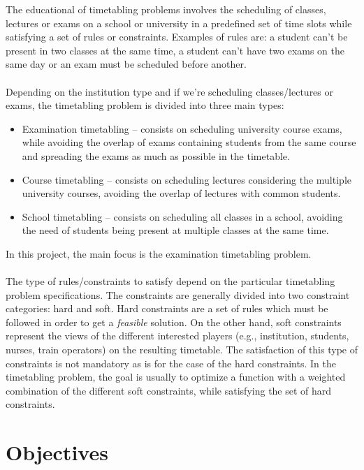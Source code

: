 The educational of timetabling problems involves the scheduling of classes, lectures or exams on a school or university in a predefined set of time slots while satisfying a set of rules or constraints. Examples of rules are: a student can't be present in two classes at the same time, a student can't have two exams on the same day or an exam must be scheduled before another.\\
\\
Depending on the institution type and if we're scheduling classes/lectures or exams, the timetabling problem is divided into three main types:\\
\begin{itemize}
	\item Examination timetabling -- consists on scheduling university course exams, while avoiding the overlap of exams containing students from the same course and spreading the exams as much as possible in the timetable.
	\item Course timetabling -- consists on scheduling lectures considering the multiple university courses, avoiding the overlap of lectures with common students.
	\item School timetabling -- consists on scheduling all classes in a school, avoiding the need of students being present at multiple classes at the same time.
\end{itemize}
In this project, the main focus is the examination timetabling problem. \\
\\
The type of rules/constraints to satisfy depend on the particular timetabling problem specifications. The constraints are generally divided into two constraint categories: hard and soft. Hard constraints are a set of rules which must be followed in order to get a \textit{feasible} solution. On the other hand, soft constraints represent the views of the different interested players (e.g., institution, students, nurses, train operators) on the resulting timetable. The satisfaction of this type of constraints is not mandatory as is for the case of the hard constraints. In the timetabling problem, the goal is usually to optimize a function with a weighted combination of the different soft constraints, while satisfying the set of hard constraints. 

\section{Objectives}
\label{sec:Objectives}

